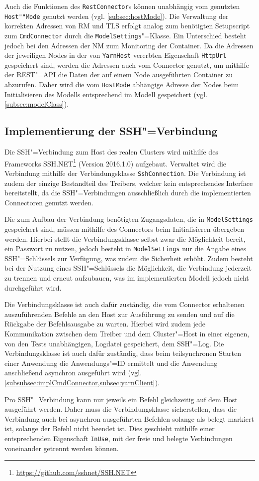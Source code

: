 Auch die Funktionen des \texttt{RestConnector}s können unabhängig vom genutzten \texttt{Host""Mode} genutzt werden (vgl. \cref{subsec:hostMode}).
Die Verwaltung der korrekten Adressen von \ac{RM} und \ac{TLS} erfolgt analog zum benötigten Setupscript zum \texttt{CmdConnector} durch die \texttt{ModelSettings}"=Klasse.
Ein Unterschied besteht jedoch bei den Adressen der \ac{NM} zum Monitoring der Container.
Da die Adressen der jeweiligen Nodes in der von \texttt{YarnHost} vererbten Eigenschaft \texttt{HttpUrl} gespeichert sind, werden die Adressen auch vom Connector genutzt, um mithilfe der REST"=API die Daten der auf einem Node ausgeführten Container zu abzurufen.
Daher wird die vom \texttt{HostMode} abhängige Adresse der Nodes beim Initialisieren des Modells entsprechend im Modell gespeichert (vgl. \cref{subsec:modelClass}).

\subsection{Implementierung der SSH"=Verbindung}
\label{subsec:sshConnection}

Die SSH"=Verbindung zum Host des realen Clusters wird mithilfe des Frameworks SSH.NET\footnote{\url{https://github.com/sshnet/SSH.NET}} (Version 2016.1.0) aufgebaut.
Verwaltet wird die Verbindung mithilfe der Verbindungsklasse \texttt{SshConnection}.
Die Verbindung ist zudem der einzige Bestandteil des Treibers, welcher kein entsprechendes Interface bereitstellt, da die SSH"=Verbindungen ausschließlich durch die implementierten Connectoren genutzt werden.

Die zum Aufbau der Verbindung benötigten Zugangsdaten, die in \texttt{ModelSettings} gespeichert sind, müssen mithilfe des Connectors beim Initialisieren übergeben werden.
Hierbei stellt die Verbindungsklasse selbst zwar die Möglichkeit bereit, ein Passwort zu nutzen, jedoch besteht in \texttt{ModelSettings} nur die Angabe eines SSH"=Schlüssels zur Verfügung, was zudem die Sicherheit erhöht.
Zudem besteht bei der Nutzung eines SSH"=Schlüssels die Möglichkeit, die Verbindung jederzeit zu trennen und erneut aufzubauen, was im implementierten Modell jedoch nicht durchgeführt wird.

Die Verbindungsklasse ist auch dafür zuständig, die vom Connector erhaltenen auszuführenden Befehle an den Host zur Ausführung zu senden und auf die Rückgabe der Befehlsausgabe zu warten.
Hierbei wird zudem jede Kommunikation zwischen dem Treiber und dem Cluster"=Host in einer eigenen, von den Tests unabhängigen, Logdatei gespeichert, dem SSH"=Log.
Die Verbindungsklasse ist auch dafür zuständig, dass beim teilsynchronen Starten einer Anwendung die Anwendungs"=ID ermittelt und die Anwendung anschließend asynchron ausgeführt wird (vgl. \cref{subsubsec:implCmdConnector,subsec:yarnClient}).

Pro SSH"=Verbindung kann nur jeweils ein Befehl gleichzeitig auf dem Host ausgeführt werden.
Daher muss die Verbindungsklasse sicherstellen, dass die Verbindung auch bei asynchron ausgeführten Befehlen solange als belegt markiert ist, solange der Befehl nicht beendet ist.
Dies geschieht mithilfe einer entsprechenden Eigenschaft \texttt{InUse}, mit der freie und belegte Verbindungen voneinander getrennt werden können.
